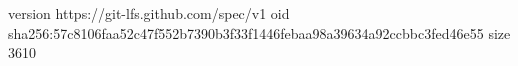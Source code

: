 version https://git-lfs.github.com/spec/v1
oid sha256:57c8106faa52c47f552b7390b3f33f1446febaa98a39634a92ccbbc3fed46e55
size 3610
